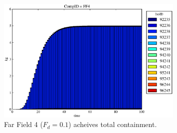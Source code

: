 \begin{frame}[ctb!]
\begin{figure}
\begin{minipage}[b]{0.45\linewidth}
  \includegraphics[width=0.8\textwidth]{./images/mcIII0.eps}
  \caption[Case MCI WP Contaminants.]{ 
    Far Field 4 ($F_d = 0.1$) acheives total containment.
    }
  \label{fig:mcII}


  \end{minipage}
\end{figure}

\end{frame}
